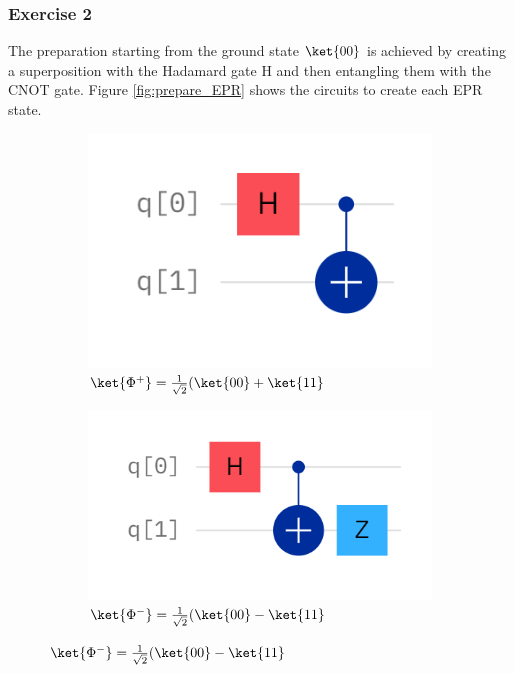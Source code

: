 \subsubsection{Exercise 2}
The preparation starting from the ground state $\ket{00}$ is achieved by creating a superposition with the Hadamard gate H and then entangling them with the CNOT gate. Figure \ref{fig:prepare_EPR} shows the circuits to create each EPR state.
\begin{figure}[h]
    \centering
    \begin{subfigure}[t]{0.19\textwidth}
        \includegraphics[width=\textwidth]{tex/figures/exercise02_01.png}
        \caption{$\ket{\Phi^+} = \frac{1}{\sqrt{2}}(\ket{00} + \ket{11}$}
        \label{fig:e0201}
    \end{subfigure}
    \begin{subfigure}[t]{0.24\textwidth}
        \includegraphics[width=\textwidth]{tex/figures/exercise02_02.png}
        \caption{$\ket{\Phi^-} = \frac{1}{\sqrt{2}}(\ket{00} - \ket{11}$}

\end{subfigure}
\end{figure}
